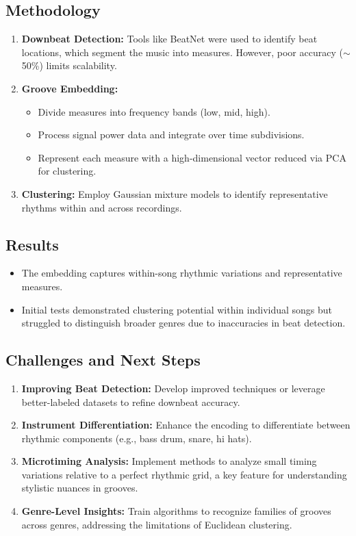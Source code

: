 \documentclass{article}
\begin{document}
\subsection*{Methodology}
\begin{enumerate}
    \item \textbf{Downbeat Detection:} Tools like BeatNet were used to identify beat locations, which segment the music into measures. However, poor accuracy ($\sim$50\%) limits scalability.
    \item \textbf{Groove Embedding:}
    \begin{itemize}
        \item Divide measures into frequency bands (low, mid, high).
        \item Process signal power data and integrate over time subdivisions.
        \item Represent each measure with a high-dimensional vector reduced via PCA for clustering.
    \end{itemize}
    \item \textbf{Clustering:} Employ Gaussian mixture models to identify representative rhythms within and across recordings.
\end{enumerate}

\subsection*{Results}
\begin{itemize}
    \item The embedding captures within-song rhythmic variations and representative measures.
    \item Initial tests demonstrated clustering potential within individual songs but struggled to distinguish broader genres due to inaccuracies in beat detection.
\end{itemize}

\subsection*{Challenges and Next Steps}
\begin{enumerate}
    \item \textbf{Improving Beat Detection:} Develop improved techniques or leverage better-labeled datasets to refine downbeat accuracy.
    \item \textbf{Instrument Differentiation:} Enhance the encoding to differentiate between rhythmic components (e.g., bass drum, snare, hi hats).
    \item \textbf{Microtiming Analysis:} Implement methods to analyze small timing variations relative to a perfect rhythmic grid, a key feature for understanding stylistic nuances in grooves.
    \item \textbf{Genre-Level Insights:} Train algorithms to recognize families of grooves across genres, addressing the limitations of Euclidean clustering.
\end{enumerate}
\end{document}
